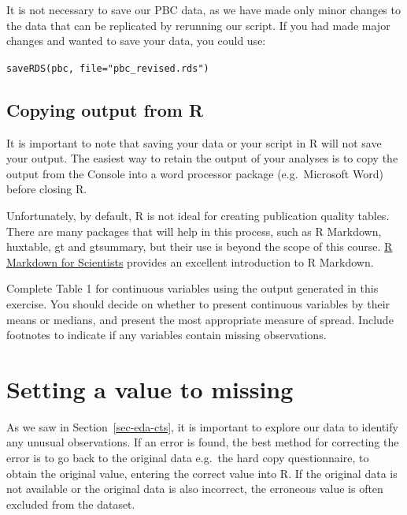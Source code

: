 \documentclass[
  a4paper,
]{memoir}
\begin{document}
It is not necessary to save our PBC data, as we have made only minor
changes to the data that can be replicated by rerunning our script. If
you had made major changes and wanted to save your data, you could use:

\texttt{saveRDS(pbc,\ file="pbc\_revised.rds")}

\subsection{Copying output from R}\label{copying-output-from-r}

It is important to note that saving your data or your script in R will
not save your output. The easiest way to retain the output of your
analyses is to copy the output from the Console into a word processor
package (e.g.~Microsoft Word) before closing R.

Unfortunately, by default, R is not ideal for creating publication
quality tables. There are many packages that will help in this process,
such as R Markdown, huxtable, gt and gtsummary, but their use is beyond
the scope of this course. \href{https://rmd4sci.njtierney.com/}{R
Markdown for Scientists} provides an excellent introduction to R
Markdown.

\begin{tcolorbox}[enhanced jigsaw, arc=.35mm, bottomrule=.15mm, bottomtitle=1mm, breakable, colback=white, colbacktitle=quarto-callout-note-color!10!white, colframe=quarto-callout-note-color-frame, coltitle=black, left=2mm, leftrule=.75mm, opacityback=0, opacitybacktitle=0.6, rightrule=.15mm, title={TASK}, titlerule=0mm, toprule=.15mm, toptitle=1mm]

Complete Table 1 for continuous variables using the output generated in
this exercise. You should decide on whether to present continuous
variables by their means or medians, and present the most appropriate
measure of spread. Include footnotes to indicate if any variables
contain missing observations.

\end{tcolorbox}

\section{Setting a value to missing}\label{setting-a-value-to-missing-1}

As we saw in Section~\ref{sec-eda-cts}, it is important to explore our
data to identify any unusual observations. If an error is found, the
best method for correcting the error is to go back to the original data
e.g.~the hard copy questionnaire, to obtain the original value, entering
the correct value into R. If the original data is not available or the
original data is also incorrect, the erroneous value is often excluded
from the dataset.
\end{document}
